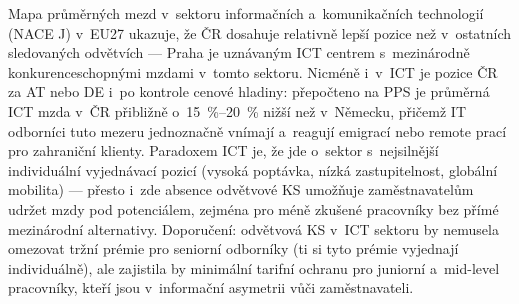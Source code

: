 Mapa průměrných mezd v~sektoru informačních a~komunikačních technologií (\ac{NACE} J) v~EU27 ukazuje, že ČR dosahuje relativně lepší pozice než v~ostatních sledovaných odvětvích --- Praha je uznávaným ICT centrem s~mezinárodně konkurenceschopnými mzdami v~tomto sektoru.
Nicméně i~v~ICT je pozice ČR za AT nebo DE i~po kontrole cenové hladiny: přepočteno na \ac{PPS} je průměrná ICT mzda v~ČR přibližně o~\SIrange{15}{20}{\percent} nižší než v~Německu, přičemž IT odborníci tuto mezeru jednoznačně vnímají a~reagují emigrací nebo remote prací pro zahraniční klienty.
Paradoxem ICT je, že jde o~sektor s~nejsilnější individuální vyjednávací pozicí (vysoká poptávka, nízká zastupitelnost, globální mobilita) --- přesto i~zde absence odvětvové \ac{KS} umožňuje zaměstnavatelům udržet mzdy pod potenciálem, zejména pro méně zkušené pracovníky bez přímé mezinárodní alternativy.
Doporučení: odvětvová \ac{KS} v~ICT sektoru by nemusela omezovat tržní prémie pro seniorní odborníky (ti si tyto prémie vyjednají individuálně), ale zajistila by minimální tarifní ochranu pro juniorní a~mid-level pracovníky, kteří jsou v~informační asymetrii vůči zaměstnavateli.


